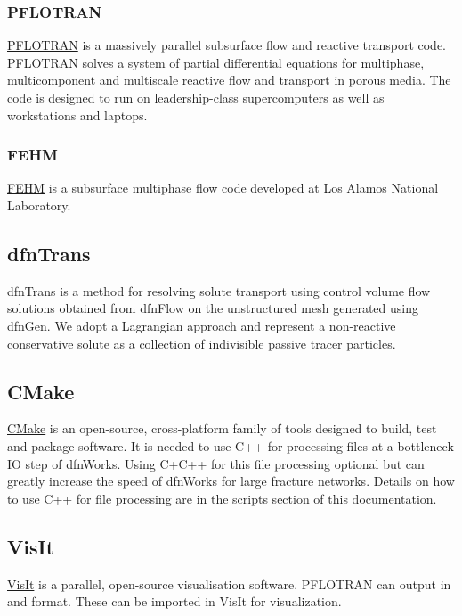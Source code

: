 \documentclass[letterpaper,10pt,english]{sphinxmanual}
\begin{document}
\subsubsection{PFLOTRAN}
\label{intro:pflotran}
\href{http://pflotran.org}{PFLOTRAN}  is a massively parallel subsurface flow and reactive transport
code. PFLOTRAN solves a system of partial differential equations for
multiphase, multicomponent and multiscale reactive flow and transport in
porous media. The code is designed to run on leadership-class supercomputers
as well as workstations and laptops.


\subsubsection{FEHM}
\label{intro:id2}\label{intro:fehm}
\href{https://fehm.lanl.gov}{FEHM} is a subsurface multiphase flow code developed at Los Alamos National
Laboratory.


\subsection{dfnTrans}
\label{intro:id3}\label{intro:dfntrans}
dfnTrans is a method for resolving solute transport using control volume flow
solutions obtained from dfnFlow on the unstructured mesh generated using
dfnGen. We adopt a Lagrangian approach and represent a non-reactive
conservative solute as a collection of indivisible passive tracer particles.


\subsection{CMake}
\label{intro:cmake}
\href{https://cmake.org}{CMake} is an open-source, cross-platform family of tools designed to build,
test and package software. It is needed to use C++ for processing files at a
bottleneck IO step of dfnWorks. Using C+C++ for this file processing optional
but can greatly increase the speed of dfnWorks for large fracture networks.
Details on how to use C++ for file processing are in the scripts section of
this documentation.


\subsection{VisIt}
\label{intro:id4}\label{intro:visit}
\href{https://wci.llnl.gov/codes/visit}{VisIt} is a parallel, open-source visualisation software. PFLOTRAN can output
in  and  format. These can be imported in VisIt for visualization.
\end{document}
